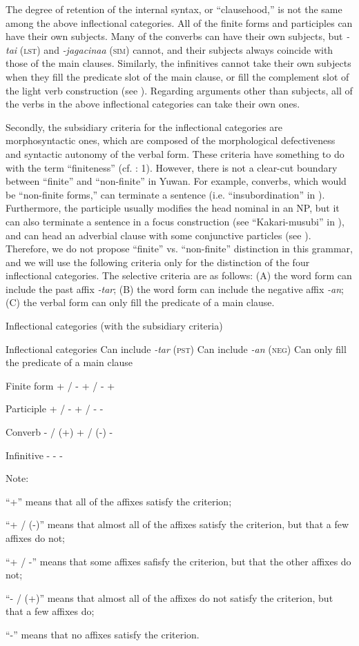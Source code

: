 The degree of retention of the internal syntax, or “clausehood,” is not the same among the above inflectional categories. All of the finite forms and participles can have their own subjects. Many of the converbs can have their own subjects, but \textit{{}-tai} (\textsc{lst}) and \textit{{}-jagacinaa} (\textsc{sim}) cannot, and their subjects always coincide with those of the main clauses. Similarly, the infinitives cannot take their own subjects when they fill the predicate slot of the main clause, or fill the complement slot of the light verb construction (see ). Regarding arguments other than subjects, all of the verbs in the above inflectional categories can take their own ones.

  Secondly, the subsidiary criteria for the inflectional categories are morphosyntactic ones, which are composed of the morphological defectiveness and syntactic autonomy of the verbal form. These criteria have something to do with the term “finiteness” (cf. \citealt{Nikolaeva2007}: 1). However, there is not a clear-cut boundary between “finite” and “non-finite” in Yuwan. For example, converbs, which would be “non-finite forms,” can terminate a sentence (i.e. “insubordination” in ). Furthermore, the participle usually modifies the head nominal in an NP, but it can also terminate a sentence in a focus construction (see “Kakari-musubi” in ), and can head an adverbial clause with some conjunctive particles (see ). Therefore, we do not propose “finite” vs. “non-finite” distinction in this grammar, and we will use the following criteria only for the distinction of the four inflectional categories. The selective criteria are as follows: (A) the word form can include the past affix \textit{{}-tar}; (B) the word form can include the negative affix \textit{{}-an}; (C) the verbal form can only fill the predicate of a main clause.

\begin{table}
\caption{\label{tab:key:78}Inflectional categories (with the subsidiary criteria)}

Inflectional categories  Can include \textit{{}-tar} (\textsc{pst})  Can include \textit{{}-an} (\textsc{neg})  Can only fill the predicate of a main clause

Finite form  + / -  + / -  +

Participle  + / -  + / -  {}-

Converb  {}- / (+)  + / (-)  {}-

Infinitive  {}-  {}-  {}-

Note:

  “+” means that all of the affixes satisfy the criterion;

“+ / (-)” means that almost all of the affixes satisfy the criterion, but that a few affixes do not;

“+ / -” means that some affixes safisfy the criterion, but that the other affixes do not;

“- / (+)” means that almost all of the affixes do not satisfy the criterion, but that a few affixes do;

“-” means that no affixes satisfy the criterion.
\end{table}

